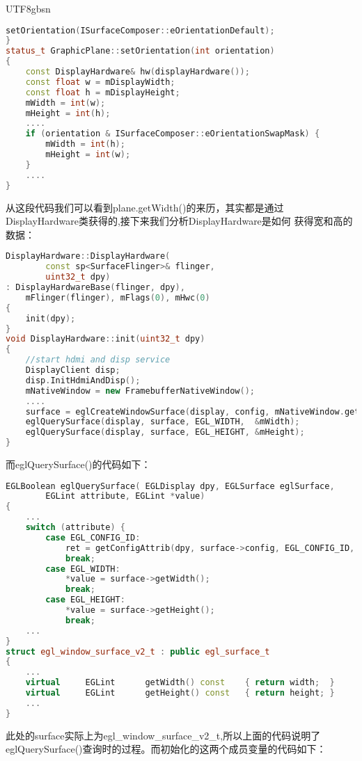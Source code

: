 \documentclass[a4paper,11pt]{article}
\begin{document}
\begin{CJK*}{UTF8}{gbsn}
\begin{enumerate}
\begin{lstlisting}[language=C++]
    setOrientation(ISurfaceComposer::eOrientationDefault);
}
status_t GraphicPlane::setOrientation(int orientation)
{
    const DisplayHardware& hw(displayHardware());
    const float w = mDisplayWidth;
    const float h = mDisplayHeight;
    mWidth = int(w);
    mHeight = int(h);
    ....
    if (orientation & ISurfaceComposer::eOrientationSwapMask) {
        mWidth = int(h);
        mHeight = int(w);
    }
    ....
}
\end{lstlisting}
        从这段代码我们可以看到plane.getWidth()的来历，其实都是通过
        DisplayHardware类获得的,接下来我们分析DisplayHardware是如何
        获得宽和高的数据：
\begin{lstlisting}[language=C++]
DisplayHardware::DisplayHardware(
        const sp<SurfaceFlinger>& flinger,
        uint32_t dpy)
: DisplayHardwareBase(flinger, dpy),
    mFlinger(flinger), mFlags(0), mHwc(0)
{           
    init(dpy);                                                                                                                                                                                
}
void DisplayHardware::init(uint32_t dpy)
{
    //start hdmi and disp service
    DisplayClient disp;
    disp.InitHdmiAndDisp();
    mNativeWindow = new FramebufferNativeWindow();
    ....
    surface = eglCreateWindowSurface(display, config, mNativeWindow.get(), NULL);
    eglQuerySurface(display, surface, EGL_WIDTH,  &mWidth);
    eglQuerySurface(display, surface, EGL_HEIGHT, &mHeight);
}
\end{lstlisting}
        而eglQuerySurface()的代码如下：
\begin{lstlisting}[language=C++]
EGLBoolean eglQuerySurface( EGLDisplay dpy, EGLSurface eglSurface,
        EGLint attribute, EGLint *value)
{
    ...
    switch (attribute) {
        case EGL_CONFIG_ID:
            ret = getConfigAttrib(dpy, surface->config, EGL_CONFIG_ID, value);
            break;
        case EGL_WIDTH:
            *value = surface->getWidth();
            break;
        case EGL_HEIGHT:
            *value = surface->getHeight();
            break;
    ...
}
struct egl_window_surface_v2_t : public egl_surface_t
{   
    ...
    virtual     EGLint      getWidth() const    { return width;  }
    virtual     EGLint      getHeight() const   { return height; }
    ...
}
\end{lstlisting}
        此处的surface实际上为egl\_window\_surface\_v2\_t,所以上面的代码说明了
        eglQuerySurface()查询时的过程。而初始化的这两个成员变量的代码如下：
\begin{lstlisting}[language=C++]

\end{lstlisting}
\end{enumerate}
\end{CJK*}
\end{document}
